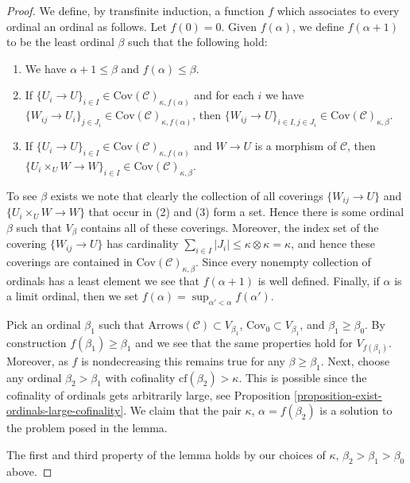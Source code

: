 \begin{proof}
\medskip\noindent
We define, by transfinite induction, a function $f$ which associates
to every ordinal an ordinal as follows. Let $f(0) = 0$.
Given $f(\alpha)$, we define $f(\alpha + 1)$ to be the least
ordinal $\beta$ such that the following hold:
\begin{enumerate}
\item We have $\alpha + 1 \leq \beta$ and $f(\alpha) \leq \beta$.
\item If $\{U_i \to U\}_{i\in I}
\in \text{Cov}(\mathcal{C})_{\kappa, f(\alpha)}$
and for each $i$ we have
$\{W_{ij} \to U_i\}_{j\in J_i}
\in \text{Cov}(\mathcal{C})_{\kappa, f(\alpha)}$,
then
$\{W_{ij} \to U\}_{i \in I, j\in J_i}
\in \text{Cov}(\mathcal{C})_{\kappa, \beta}$.
\item If $\{U_i \to U\}_{i\in I}
\in \text{Cov}(\mathcal{C})_{\kappa, f(\alpha)}$
and $W \to U$ is a morphism of $\mathcal{C}$, then
$\{U_i \times_U W \to W \}_{i\in I}
\in \text{Cov}(\mathcal{C})_{\kappa, \beta}$.
\end{enumerate}
To see $\beta$ exists we note that clearly the collection of all
coverings $\{W_{ij} \to U\}$ and $\{U_i \times_U W \to W \}$ that occur in
(2) and (3) form a set. Hence there is some ordinal $\beta$ such that
$V_\beta$ contains all of these coverings. Moreover, the index set
of the covering $\{W_{ij} \to U\}$ has cardinality
$\sum_{i \in I} |J_i| \leq \kappa \otimes \kappa = \kappa$, and
hence these coverings are contained in
$\text{Cov}(\mathcal{C})_{\kappa, \beta}$.
Since every nonempty collection of ordinals has a least element
we see that $f(\alpha + 1)$ is well defined. Finally, if $\alpha$
is a limit ordinal, then we set
$f(\alpha) = \sup_{\alpha' < \alpha} f(\alpha')$.

\medskip\noindent
Pick an ordinal $\beta_1$ such that
$\text{Arrows}(\mathcal{C}) \subset V_{\beta_1}$,
$\text{Cov}_0 \subset V_{\beta_1}$,
and $\beta_1 \geq \beta_0$.
By construction $f(\beta_1) \geq \beta_1$ and we see that
the same properties hold for $V_{f(\beta_1)}$. Moreover, as $f$ is
nondecreasing this remains true for any $\beta \geq \beta_1$.
Next, choose any ordinal $\beta_2 > \beta_1$ with
cofinality $\text{cf}(\beta_2) > \kappa$. This is possible
since the cofinality of ordinals gets arbitrarily large, see
Proposition \ref{proposition-exist-ordinals-large-cofinality}.
We claim that the pair $\kappa$,
$\alpha = f(\beta_2)$ is a solution to the problem posed in the lemma.

\medskip\noindent
The first and third property of the lemma holds by our choices
of $\kappa$, $\beta_2 > \beta_1 > \beta_0$ above.


\end{proof}
